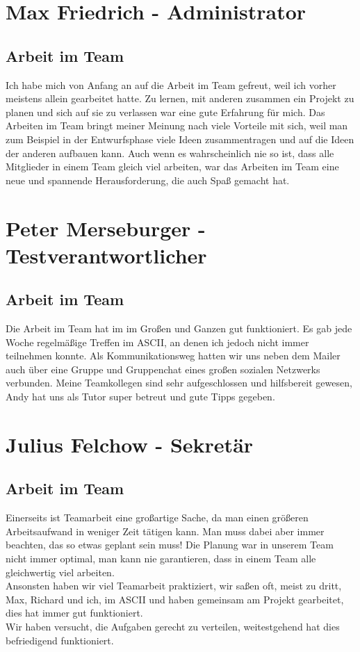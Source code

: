 \documentclass[a4paper]{scrreprt}
\begin{document}
\chapter{Max Friedrich - Administrator}
\section{Arbeit im Team}
Ich habe mich von Anfang an auf die Arbeit im Team gefreut, weil ich vorher meistens allein gearbeitet hatte. Zu lernen, mit anderen zusammen ein Projekt zu planen und sich auf sie zu verlassen war eine gute Erfahrung für mich. Das Arbeiten im Team bringt meiner Meinung nach viele Vorteile mit sich, weil man zum Beispiel in der Entwurfsphase viele Ideen zusammentragen und auf die Ideen der anderen aufbauen kann. 
Auch wenn es wahrscheinlich nie so ist, dass alle Mitglieder in einem Team gleich viel arbeiten, war das Arbeiten im Team eine neue und spannende Herausforderung, die auch Spaß gemacht hat. 

\chapter{Peter Merseburger - Testverantwortlicher}
\section{Arbeit im Team}
Die Arbeit im Team hat im im Großen und Ganzen gut funktioniert. Es gab jede Woche regelmäßige Treffen im ASCII, an denen ich jedoch nicht immer teilnehmen konnte. Als Kommunikationsweg hatten wir uns neben dem Mailer auch über eine Gruppe und Gruppenchat eines großen sozialen Netzwerks verbunden. Meine Teamkollegen sind sehr aufgeschlossen und hilfsbereit gewesen, Andy hat uns als Tutor super betreut und gute Tipps gegeben.  

\chapter{Julius Felchow - Sekretär}
\section{Arbeit im Team}
Einerseits ist Teamarbeit eine großartige Sache, da man einen größeren Arbeitsaufwand in weniger Zeit tätigen kann. Man muss dabei aber immer beachten, das so etwas geplant sein muss! Die Planung war in unserem Team nicht immer optimal, man kann nie garantieren, dass in einem Team alle gleichwertig viel arbeiten.\\
Ansonsten haben wir viel Teamarbeit praktiziert, wir saßen oft, meist zu dritt, Max, Richard und ich, im ASCII und haben gemeinsam am Projekt gearbeitet, dies hat immer gut funktioniert.\\
Wir haben versucht, die Aufgaben gerecht zu verteilen, weitestgehend hat dies befriedigend funktioniert.\\
\end{document}

